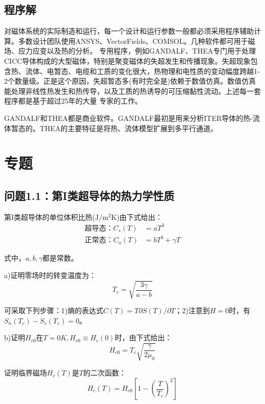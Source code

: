 \subsection{程序解}
对磁体系统的实际制造和运行，每一个设计和运行参数一般都必须采用程序辅助计算。多数设计团队使用ANSYS、VectorFields、COMSOL。几种软件都可用于磁场、应力应变以及热的分析。
专用程序，例如GANDALF、THEA专门用于处理CICC导体构成的大型磁体，特别是聚变磁体的失超发生和传播现象。失超现象包含热、流体、电暂态、电缆和工质的变化很大，热物理和电性质的变动幅度跨越1-2个数量级。正是这个原因，失超暂态多(有时完全是)依赖于数值仿真。数值仿真能处理非线性热发生和热传导，以及工质的热诱导的可压缩黏性流动。上述每一套程序都是基于超过25年的大量
专家的工作。

GANDALF和THEA都是商业软件。GANDALF最初是用来分析ITER导体的热-流体暂态的。THEA的主要特征是将热、流体模型扩展到多平行通道。

\section{专题}
\subsection{问题1.1：第I类超导体的热力学性质}
第I类超导体的单位体积比热($\mathrm{J/m^2K}$)由下式给出：
\begin{subequations}\label{eqn:1.4ab}
	\begin{align}
\mbox{超导态：} C_s(T) &= aT^3 \\
\mbox{正常态：} C_n(T)&= bT^3+\gamma T	
	\end{align}
\end{subequations}

式中，$a,b,\gamma$都是常数。

a)证明零场时的转变温度为：
\begin{equation}\label{eqn:1.5}
  T_c=\sqrt{\frac{3\gamma}{a-b}}
\end{equation}

可采取下列步骤：1)熵的表达式$C(T)=T\partial S(T)/\partial T$；2)注意到$H=0$时，有$S_n(T_c)-S_s(T_c)=0$。

b)证明$H_{c0}$在$T=0K, H_{c0}\equiv H_c(0)$时，由下式给出：
\begin{equation}\label{eqn:1.6}
  H_{c0}=T_c \sqrt{\frac{\gamma}{2\mu_0}}
\end{equation}

证明临界磁场$H_c(T)$是$T$的二次函数：
\begin{equation}\label{eqn:1.7}
  H_c(T)=H_{c0}\left[1-(\frac{T}{T_c})^2\right]
\end{equation}


